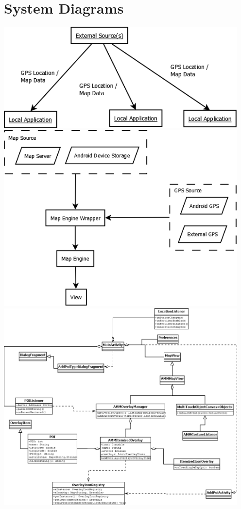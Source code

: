 \documentclass{article}
\begin{document}
\section{System Diagrams}
\includegraphics[keepaspectratio, width=5in]{HighLevelSystemView.png} \\
\includegraphics[keepaspectratio, width=5in]{NotDataFlowDiagram.png} \\
\includegraphics[keepaspectratio, width=5in]{../Design/ClassDiagram.png} \\
\end{document}
